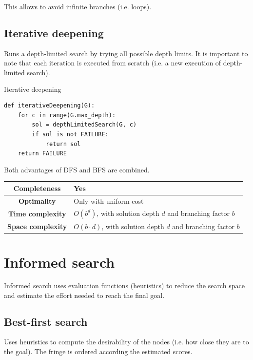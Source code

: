 This allows to avoid infinite branches (i.e. loops).



\subsection{Iterative deepening}
Runs a depth-limited search by trying all possible depth limits.
It is important to note that each iteration is executed from scratch (i.e. a new execution of depth-limited search).

\begin{algorithm}
\caption{Iterative deepening}
\begin{lstlisting}
def iterativeDeepening(G):
    for c in range(G.max_depth):
        sol = depthLimitedSearch(G, c)
        if sol is not FAILURE:
            return sol
    return FAILURE
\end{lstlisting}
\end{algorithm}

Both advantages of DFS and BFS are combined.

\begin{center}
    \def\arraystretch{1.2}
    \begin{tabular}{c | m{10cm}}
        \hline
        \textbf{Completeness} & Yes \\
        \hline
        \textbf{Optimality} & Only with uniform cost \\
        \hline
        \textbf{Time complexity}
            & $O(b^d)$, with solution depth $d$ and branching factor $b$ \\
        \hline
        \textbf{Space complexity}
            & $O(b \cdot d)$, with solution depth $d$ and branching factor $b$ \\
        \hline
    \end{tabular}
\end{center}



\section{Informed search}
Informed search uses evaluation functions (heuristics) to reduce the search space and
estimate the effort needed to reach the final goal.


\subsection{Best-first search}
Uses heuristics to compute the desirability of the nodes (i.e. how close they are to the goal).
The fringe is ordered according the estimated scores.


